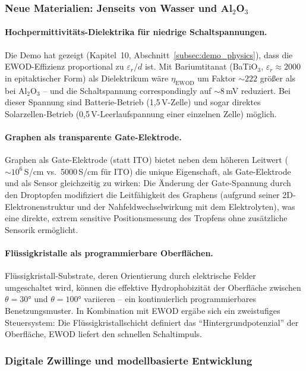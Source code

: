 ﻿\documentclass[a4paper,12pt]{scrreprt}
\theoremstyle{definition}
\begin{document}
\subsubsection{Neue Materialien: Jenseits von Wasser und Al\texorpdfstring{$_2$}{2}O\texorpdfstring{$_3$}{3}}
\label{subsubsec:materialien}

\paragraph{Hochpermittivitäts-Dielektrika für niedrige Schaltspannungen.}
Die Demo hat gezeigt (Kapitel~10, Abschnitt~\ref{subsec:demo_physics}),
dass die EWOD-Effizienz proportional zu $\varepsilon_r/d$ ist.
Mit Bariumtitanat (BaTiO$_3$, $\varepsilon_r \approx 2000$ in
epitaktischer Form) als Dielektrikum wäre $\eta_\text{EWOD}$ um
Faktor $\sim 222$ größer als bei Al$_2$O$_3$ -- und die Schaltspannung
correspondingly auf $\sim$8\,mV reduziert. Bei dieser Spannung sind
Batterie-Betrieb (1,5\,V-Zelle) und sogar direktes Solarzellen-Betrieb
(0,5\,V-Leerlaufspannung einer einzelnen Zelle) möglich.

\paragraph{Graphen als transparente Gate-Elektrode.}
Graphen als Gate-Elektrode (statt ITO) bietet neben dem höheren
Leitwert ($\sim 10^6$\,S/cm vs.\ 5000\,S/cm für ITO) die unique
Eigenschaft, als Gate-Elektrode und als Sensor gleichzeitig zu
wirken: Die Änderung der Gate-Spannung durch den Droptopfen
modifiziert die Leitfähigkeit des Graphens (aufgrund seiner
2D-Elektronenstruktur und der Nahfeldwechselwirkung mit dem
Elektrolyten), was eine direkte, extrem sensitive Positionsmessung
des Tropfens ohne zusätzliche Sensorik ermöglicht.

\paragraph{Flüssigkristalle als programmierbare Oberflächen.}
Flüssigkristall-Substrate, deren Orientierung durch elektrische
Felder umgeschaltet wird, können die effektive Hydrophobizität der
Oberfläche zwischen $\theta = 30 °$ und $\theta = 100 °$ variieren --
ein kontinuierlich programmierbares Benetzungsmuster. In Kombination
mit EWOD ergäbe sich ein zweistufiges Steuersystem: Die
Flüssigkristallschicht definiert das ``Hintergrundpotenzial''
der Oberfläche, EWOD liefert den schnellen Schaltimpuls.

\subsubsection{Digitale Zwillinge und modellbasierte Entwicklung}
\label{subsubsec:digital_twin}
\end{document}
